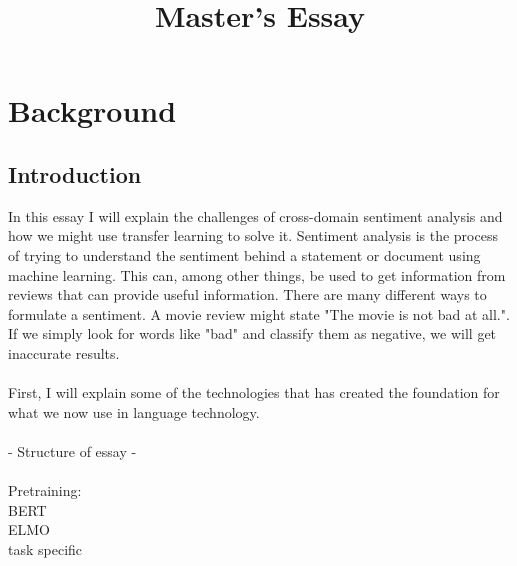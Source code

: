 \documentclass{report}
\begin{document}
\title{Master's Essay}
\duoforside[author={Adrian Eriksen}, dept={Department of Informatics}, program={Language Technology}]

\tableofcontents
\newpage
\chapter{Background}
\section{Introduction}
In this essay I will explain the challenges of cross-domain sentiment analysis and how we might use transfer learning to solve it.
Sentiment analysis is the process of trying to understand the sentiment behind a statement or document using machine learning. This can, among other things, be used to get information from reviews that can provide useful information.
There are many different ways to formulate a sentiment. A movie review might state "The movie is not bad at all.". If we simply look for words like "bad" and classify them as negative, we will get inaccurate results.\\\\
First, I will explain some of the technologies that has created the foundation for what we now use in language technology.
\\\\  - Structure of essay - \\\\
Pretraining:\\ 
BERT\\
ELMO\\
task specific\\


\newpage
\end{document}
